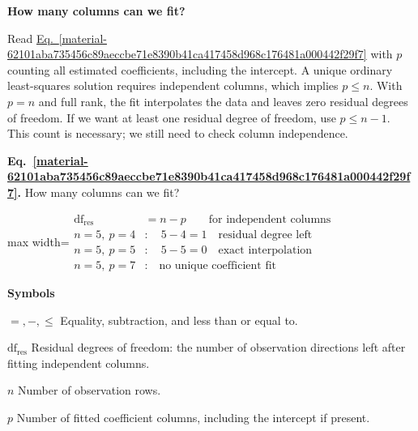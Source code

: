 \documentclass[11pt,a4paper]{article}
\begin{document}
\medskip

\textbf{How many columns can we fit?}


Read \hyperref[material-62101aba735456c89aeccbe71e8390b41ca417458d968c176481a000442f29f7]{Eq.~\ref*{material-62101aba735456c89aeccbe71e8390b41ca417458d968c176481a000442f29f7}} with \(p\) counting all estimated coefficients, including the intercept. A unique ordinary least-squares solution requires independent columns, which implies \(p\leq n\). With \(p=n\) and full rank, the fit interpolates the data and leaves zero residual degrees of freedom. If we want at least one residual degree of freedom, use \(p\leq n-1\). This count is necessary; we still need to check column independence.


\par\medskip
\noindent\begin{minipage}{\linewidth}
\label{material-62101aba735456c89aeccbe71e8390b41ca417458d968c176481a000442f29f7}
\noindent\textbf{Eq.~\ref*{material-62101aba735456c89aeccbe71e8390b41ca417458d968c176481a000442f29f7}.} How many columns can we fit?\par\nopagebreak
\begin{center}\begin{adjustbox}{max width=\linewidth}$\displaystyle \begin{aligned}\mathrm{df}_{\mathrm{res}}&=n-p\qquad\text{for independent columns}\\[.5em]n=5,\ p=4&:\quad 5-4=1 \quad\text{residual degree left}\\[.35em]n=5,\ p=5&:\quad 5-5=0 \quad\text{exact interpolation}\\[.35em]n=5,\ p=7&:\quad \text{no unique coefficient fit}\end{aligned}$\end{adjustbox}\end{center}

\par\noindent\textbf{Symbols}

\par\noindent\textbf{\(=,-,\leq\)} Equality, subtraction, and less than or equal to.

\par\noindent\textbf{\(\mathrm{df}_{\mathrm{res}}\)} Residual degrees of freedom: the number of observation directions left after fitting independent columns.

\par\noindent\textbf{\(n\)} Number of observation rows.

\par\noindent\textbf{\(p\)} Number of fitted coefficient columns, including the intercept if present.

\end{minipage}\par
\medskip
\end{document}
